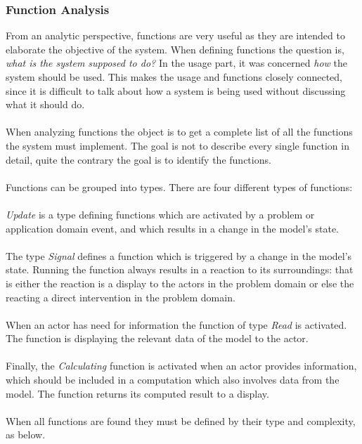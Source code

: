 	\subsubsection{Function Analysis}
		From an analytic perspective, functions are very useful as they are intended to elaborate the objective of the system. When defining functions the question is, \textit{what is the system supposed to do?} In the usage part, it was concerned \textit{how} the system should be used. This makes the usage and functions closely connected, since it is difficult to talk about how a system is being used without discussing what it should do.\\\\
		When analyzing functions the object is to get a complete list of all the functions the system must implement. The goal is not to describe every single function in detail, quite the contrary the goal is to identify the functions.\\\\
		Functions can be grouped into types. There are four different types of functions:\\\\
		\textit{Update} is a type defining functions which are activated by a problem or application domain event, and which results in a change in the model's state.\\\\
		The type \textit{Signal} defines a function which is triggered by a change in the model's state. Running the function always results in a reaction to its surroundings: that is either the reaction is a display to the actors in the problem domain or else the reacting a direct intervention in the problem domain.\\\\
		When an actor has need for information the function of type \textit{Read} is activated. The function is displaying the relevant data of the model to the actor.\\\\
		Finally, the \textit{Calculating} function is activated when an actor provides information, which should be included in a computation which also involves data from the model. The function returns its computed result to a display.\\\\
		When all functions are found they must be defined by their type and complexity, as below.
